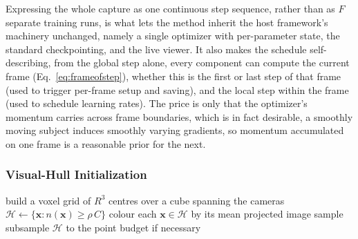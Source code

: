 Expressing the whole capture
as one continuous step sequence, rather than as $F$ separate training runs, is what
lets the method inherit the host framework's machinery unchanged, namely a single
optimizer with per-parameter state, the standard checkpointing, and the live viewer.
It also makes the schedule self-describing, from the global step alone, every
component can compute the current frame (Eq.~\eqref{eq:frameofstep}), whether this is
the first or last step of that frame (used to trigger per-frame setup and saving), and
the local step within the frame (used to schedule learning rates). The price is only
that the optimizer's momentum carries across frame boundaries, which is in fact
desirable, a smoothly moving subject induces smoothly varying gradients, so momentum
accumulated on one frame is a reasonable prior for the next.

\subsubsection{Visual-Hull Initialization}
\label{sec:hull}

\begin{algorithm}[t]
\SetAlgoLined
{}
build a voxel grid of $R^3$ centres over a cube spanning the cameras\;
$\mathcal{H} \gets \{\mathbf{x} : n(\mathbf{x}) \ge \rho\,C\}$ 
colour each $\mathbf{x}\in\mathcal{H}$ by its mean projected image sample\;
subsample $\mathcal{H}$ to the point budget if necessary\;
\caption{Visual-hull carving (\textsc{CarveVisualHull}).}
\label{alg:carve}
\end{algorithm}

